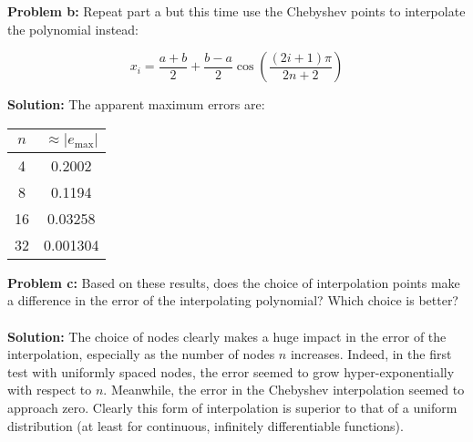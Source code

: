 \documentclass{article}
\begin{document}
\textbf{Problem b:} Repeat part a but this time use the Chebyshev points to interpolate the polynomial instead:

$$x_i=\frac{a+b}{2}+\frac{b-a}{2}\cos\left(\frac{(2i+1)\pi}{2n+2}\right)$$

\textbf{Solution:} The apparent maximum errors are:

\begin{center}
\begin{tabular}{c|c}
$n$ & $\approx|e_{\text{max}}|$ \\\hline
4 & 0.2002 \\
8 & 0.1194\\
16 & 0.03258 \\
32 & 0.001304 \\
\end{tabular}
\end{center}

\textbf{Problem c:} Based on these results, does the choice of interpolation points make a difference in the error of the interpolating polynomial? Which choice is better?
\\\\
\textbf{Solution:} The choice of nodes clearly makes a huge impact in the error of the interpolation, especially as the number of nodes $n$ increases. Indeed, in the first test with uniformly spaced nodes, the error seemed to grow hyper-exponentially with respect to $n$. Meanwhile, the error in the Chebyshev interpolation seemed to approach zero. Clearly this form of interpolation is superior to that of a uniform distribution (at least for continuous, infinitely differentiable functions).
\end{document}
